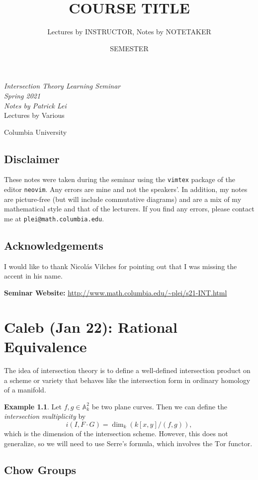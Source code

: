 \documentclass[leqno, openany]{memoir}
\title{COURSE TITLE}
\author{Lectures by INSTRUCTOR, Notes by NOTETAKER}
\date{SEMESTER}
\theoremstyle{definition}
\newtheorem{exm}[thm]{Example}
\theoremstyle{remark}
\theoremstyle{plain}
\theoremstyle{definition}
\theoremstyle{remark}
\newcommand{\A}{\mathbb{A}}
\newcommand{\mr}[1]{\mathrm{#1}}
\newcommand*{\titleSW}
    {\begingroup%
    \raggedleft
    \vspace*{\baselineskip}
    {\Huge\itshape Intersection Theory Learning Seminar \\ Spring 2021}\\[\baselineskip]
    {\large\itshape Notes by Patrick Lei}\\[0.2\textheight]
    {\Large Lectures by Various}\par
    \vfill
    {\Large \sffamily Columbia University}
    \vspace*{\baselineskip}
\endgroup}
\begin{document}
    
\begin{titlingpage}
\titleSW
\end{titlingpage}

\thispagestyle{empty}
\section*{Disclaimer}%
\label{sec:disclaimer}

These notes were taken during the seminar using the \texttt{vimtex} package of
the editor \texttt{neovim}.  Any errors are mine and not the speakers'.  In
addition, my notes are picture-free (but will include commutative diagrams) and
are a mix of my mathematical style and that of the lecturers.  If you find any
errors, please contact me at \texttt{plei@math.columbia.edu}.

\section*{Acknowledgements}%

I would like to thank Nicol\'as Vilches for pointing out that I was missing the
accent in his name.

\vspace*{1cm}

\noindent\textbf{Seminar Website:}
\url{http://www.math.columbia.edu/~plei/s21-INT.html} \newpage

\tableofcontents

\chapter{Caleb (Jan 22): Rational Equivalence}%
\label{cha:caleb_jan_22_rational_equivalence}

The idea of intersection theory is to define a well-defined intersection
product on a scheme or variety that behaves like the intersection form in
ordinary homology of a manifold.

\begin{exm} Let $f, g \in \A_k^2$ be two plane curves. Then we can define the
    \textit{intersection multiplicity} by \[ i(I, F \cdot G) = \dim_k (k[x,y] /
    (f,g)), \] which is the dimension of the intersection scheme. However, this
    does not generalize, so we will need to use Serre's formula, which involves
    the $\mr{Tor}$ functor.  \end{exm}

\section{Chow Groups}%
\end{document}
